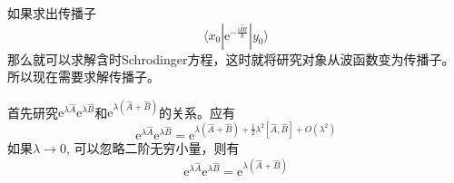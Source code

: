 \documentclass[12pt]{article}
\begin{document}
    如果求出传播子
    \begin{equation}
        \langle x_0 | \mathrm{e}^{-\frac {\mathrm{i}\hat{H}t}{\hbar}} | y_0 \rangle
    \end{equation}
    那么就可以求解含时Schrodinger方程，这时就将研究对象从波函数变为传播子。所以现在需要求解传播子。

    首先研究$\mathrm{e}^{\lambda \hat{A}}\mathrm{e}^{\lambda \hat{B}}$和$\mathrm{e}^{\lambda (\hat{A}+\hat{B})}$的关系。应有
    \begin{equation}
        \mathrm{e}^{\lambda \hat{A}} \mathrm{e}^{\lambda \hat{B}} = \mathrm{e}^{\lambda (\hat{A}+\hat{B}) + \frac 12 \lambda^2 [\hat{A},\hat{B}] + O(\lambda^2)}
    \end{equation}
    如果$\lambda \to 0$, 可以忽略二阶无穷小量，则有
    \begin{equation}
        \mathrm{e}^{\lambda \hat{A}} \mathrm{e}^{\lambda \hat{B}} = \mathrm{e}^{\lambda (\hat{A}+\hat{B})}
    \end{equation}
\end{document}
